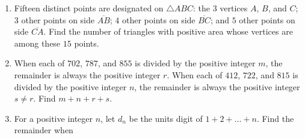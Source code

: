 \documentclass{article}
\begin{document}
\begin{enumerate}[label=\arabic*., itemsep=0.5em]\item Fifteen distinct points are designated on \(\triangle ABC\): the 3 vertices \(A\), \(B\), and \(C\); \(3\) other points on side \(\overline{AB}\); \(4\) other points on side \(\overline{BC}\); and \(5\) other points on side \(\overline{CA}\). Find the number of triangles with positive area whose vertices are among these \(15\) points.\par \vspace{0.5em}\item When each of \(702\), \(787\), and \(855\) is divided by the positive integer \(m\), the remainder is always the positive integer \(r\). When each of \(412\), \(722\), and \(815\) is divided by the positive integer \(n\), the remainder is always the positive integer \(s \neq r\). Find \(m+n+r+s\).\par \vspace{0.5em}\item For a positive integer \(n\), let \(d_n\) be the units digit of \(1 + 2 + \dots + n\). Find the remainder when


\end{enumerate}
\end{document}
